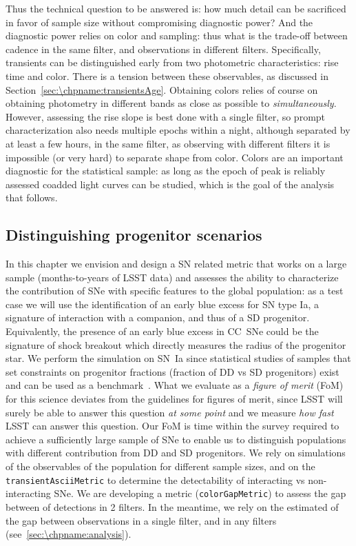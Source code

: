 Thus the technical question to be answered is: how much detail can be
sacrificed in favor of sample size without compromising diagnostic
power? And the diagnostic power relies on color and sampling: thus
what is the trade-off between cadence in the same filter, and
observations in different filters. Specifically, transients can be
distinguished early from two photometric characteristics: rise time
and color. There is a tension between these observables, as discussed
in Section~\ref{sec:\chpname:transientsAge}. Obtaining colors relies
of course on obtaining photometry in different bands as close as
possible to \emph{simultaneously}.  However, assessing the rise slope
is best done with a single filter, so prompt characterization also
needs multiple epochs within a night, although separated by at least a
few hours, in the same filter, as observing with different
filters it is impossible (or very hard) to separate shape from
color. Colors are an important diagnostic for the
statistical sample: as long as the epoch of peak is reliably assessed
coadded light curves can be studied, which is the goal of the analysis
that follows.

\subsection{Distinguishing progenitor scenarios}

In this chapter we envision and design a SN related metric that works
on a large sample (months-to-years of LSST data) and assesses the
ability to characterize the contribution of SNe with specific features
to the global population: as a test case we will use the identification of
an early blue excess for SN type Ia, a signature of interaction with a
companion, and thus of a SD progenitor. Equivalently, the presence of
an early blue excess in CC~SNe could be the signature of
shock breakout which directly measures the radius of the progenitor
star. We perform the simulation on SN~Ia since statistical studies of
samples that set constraints on progenitor fractions (fraction of DD
vs SD progenitors) exist and can be used as a
benchmark~\citep{Hayden2010, Bianco11}.  What we evaluate as a
\emph{figure of merit} (FoM) for this science deviates from the
guidelines for figures of merit, since LSST will surely be able to
answer this question \emph{at some point} and we measure \emph{how
  fast} LSST can answer this question. Our FoM is time
within the survey required to achieve a sufficiently large sample of
SNe to enable us to distinguish
populations with different contribution from DD and SD progenitors.
We rely on simulations of the observables of the population for
different sample sizes, and on the \texttt{transientAsciiMetric} to
determine the detectability of interacting vs non-interacting
SNe. We are developing a metric (\texttt{colorGapMetric}) to assess
the gap between of detections in 2 filters. In the meantime, we rely on
the estimated of the gap between observations in a single filter, and
in any filters (see~\autoref{sec:\chpname:analysis}).

